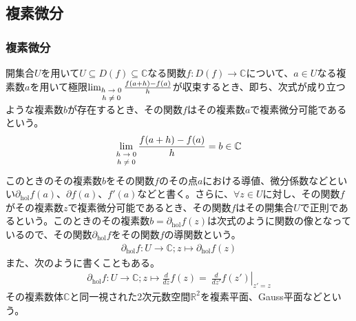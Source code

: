 \documentclass[dvipdfmx]{jsarticle}
\begin{document}
\subsection{複素微分}%
\subsubsection{複素微分}%
\begin{dfn}
開集合$U$を用いて$U \subseteq D(f) \subseteq \mathbb{C}$なる関数$f:D(f) \rightarrow \mathbb{C}$について、$a \in U$なる複素数$a$を用いて極限$\lim_{\scriptsize \begin{matrix}
h \rightarrow 0 \\
h \neq 0 \\
\end{matrix}}\frac{f(a + h) - f(a)}{h}$が収束するとき、即ち、次式が成り立つような複素数$b$が存在するとき、その関数$f$はその複素数$a$で複素微分可能であるという。
\begin{align*}
\lim_{\scriptsize \begin{matrix}
h \rightarrow 0 \\
h \neq 0 \\
\end{matrix}}\frac{f(a + h) - f(a)}{h} = b \in \mathbb{C}
\end{align*}
このときのその複素数$b$をその関数$f$のその点$a$における導値、微分係数などといい$\partial_{\mathrm{hol}}f(a)$、$\partial f(a)$、$f'(a)$などと書く。さらに、$\forall z \in U$に対し、その関数$f$がその複素数$z$で複素微分可能であるとき、その関数$f$はその開集合$U$で正則であるという。このときのその複素数$b = \partial_{\mathrm{hol}}f(z)$は次式のように関数の像となっているので、その関数$\partial_{\mathrm{hol}}f$をその関数$f$の導関数という。
\begin{align*}
\partial_{\mathrm{hol}}f:U \rightarrow \mathbb{C};z \mapsto \partial_{\mathrm{hol}}f(z)
\end{align*}
また、次のように書くこともある。
\begin{align*}
\partial_{\mathrm{hol}}f:U \rightarrow \mathbb{C};z \mapsto \frac{d}{dz}f(z) = \left. \ \frac{d}{dz'}f\left( z' \right) \right|_{z' = z}
\end{align*}
その複素数体$\mathbb{C}$と同一視された2次元数空間$\mathbb{R}^{2}$を複素平面、Gauss平面などという。
\end{dfn}
\end{document}
